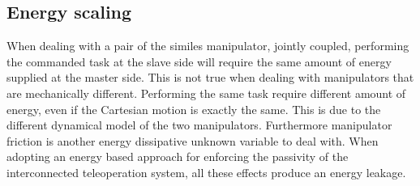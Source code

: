 \subsection{Energy scaling}
When dealing with a pair of the similes manipulator, jointly coupled, performing the commanded task at the slave side will require the same amount of energy supplied at the master side.
This is not true when dealing with manipulators that are mechanically different.
Performing the same task require different amount of energy, even if the Cartesian motion is exactly the same.
This is due to the different dynamical model of the two manipulators. Furthermore manipulator friction is another energy dissipative unknown variable to deal with.
When adopting an energy based approach for enforcing the passivity of the interconnected teleoperation system, all these effects produce an energy leakage.

